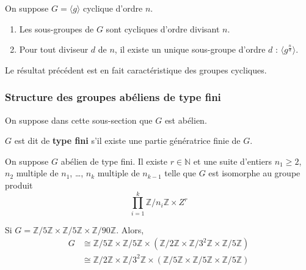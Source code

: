   \begin{theorem}
    On suppose $G = \langle g \rangle$ cyclique d'ordre $n$.
    \begin{enumerate}[label={\bfseries(\roman*)}]
      \item Les sous-groupes de $G$ sont cycliques d'ordre divisant $n$.
      \item Pour tout diviseur $d$ de $n$, il existe un unique sous-groupe d'ordre $d$ : $\langle g^{\frac{n}{d}} \rangle$.
    \end{enumerate}
  \end{theorem}

  \begin{remark}
    Le résultat précédent est en fait caractéristique des groupes cycliques.
  \end{remark}

  \subsubsection{Structure des groupes abéliens de type fini}


  On suppose dans cette sous-section que $G$ est abélien.

  \begin{definition}
    $G$ est dit de \textbf{type fini} s'il existe une partie génératrice finie de $G$.
  \end{definition}


  \begin{theorem}
    On suppose $G$ abélien de type fini. Il existe $r \in \mathbb{N}$ et une suite d'entiers $n_1 \geq 2$, $n_2$ multiple de $n_1$, \dots, $n_k$ multiple de $n_{k-1}$ telle que $G$ est isomorphe au groupe produit
    \[ \prod_{i=1}^k \mathbb{Z}/n_i\mathbb{Z} \times Z^r \]
  \end{theorem}

  \begin{example}
    Si $G = \mathbb{Z}/5\mathbb{Z} \times \mathbb{Z}/5\mathbb{Z} \times \mathbb{Z}/90\mathbb{Z}$. Alors,
    \begin{align*}
      G &\cong \mathbb{Z}/5\mathbb{Z} \times \mathbb{Z}/5\mathbb{Z} \times (\mathbb{Z}/2\mathbb{Z} \times \mathbb{Z}/3^2\mathbb{Z} \times \mathbb{Z}/5\mathbb{Z}) \\
      &\cong \mathbb{Z}/2\mathbb{Z} \times \mathbb{Z}/3^2\mathbb{Z} \times (\mathbb{Z}/5\mathbb{Z} \times \mathbb{Z}/5\mathbb{Z} \times \mathbb{Z}/5\mathbb{Z})
    \end{align*}
  \end{example}

